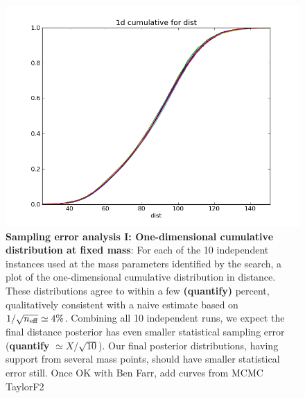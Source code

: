 \documentclass[twocolumn,prd,nofootinbib]{revtex4}
\newcommand\editremark[1]{{\color{red} #1}}
\begin{document}
\begin{figure}
\includegraphics[width=\columnwidth]{../Figures/v2runs_coinc_id_833_cumulative-multiplot-distance-MASS_SET_0}
\caption{\label{fig:FiducialEvent:Cumulatives:Comparison:TriggerMasses}\textbf{Sampling error analysis I: One-dimensional cumulative distribution at fixed mass}:  For each of the 10 independent
  instances used at  the mass  parameters   identified by the search, a plot of the one-dimensional cumulative
  distribution in distance.  These distributions agree to within a few \textbf{(quantify)} percent, qualitatively
  consistent with a naive estimate based on $1/\sqrt{n_{\rm eff}} \simeq 4\%$.   Combining all 10
  independent runs, we expect the final distance posterior has even smaller statistical sampling error
  (\textbf{quantify} $\simeq X/\sqrt{10}$).  Our final posterior
  distributions, having support from several mass points, should have smaller statistical error still.
 \editremark{Once OK with Ben Farr, add curves from MCMC TaylorF2}
}
\end{figure}
\end{document}

